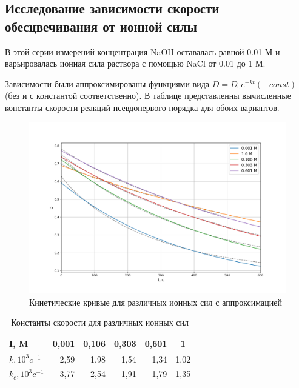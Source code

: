 \documentclass[a4paper, 12pt]{article}
\begin{document}
\newpage
\subsection{Исследование зависимости скорости обесцвечивания от ионной силы}


В этой серии измерений концентрация NaOH оставалась равной 0.01 М и варьировалась ионная сила раствора с помощью NaCl от 0.01 до 1 М. 

Зависимости были аппроксимированы функциями вида $D = D_0 e^{-kt}( +const)$ (без и с константой соответственно). В таблице представленны вычисленные константы скорости реакций псевдопервого порядка для обоих вариантов.
 \begin{figure}[h!]
    \begin{center}
    \includegraphics[width=1\textwidth]{fig3.2.png}
    \end{center}
    \caption{Кинетические кривые для различных ионных сил с аппроксимацией}
\end{figure}

\begin{table}[h!]
\begin{center}
\caption{Константы скорости для различных ионных сил}
\begin{tabular}{|l|r|r|r|r|r|}
\hline
I, M                         & \multicolumn{1}{c|}{0,001} & \multicolumn{1}{c|}{0,106} & \multicolumn{1}{c|}{0,303} & \multicolumn{1}{c|}{0,601} & \multicolumn{1}{c|}{1} \\ \hline
$k, 10^3 c^{-1}$   & 2,59                       & 1,98                       & 1,54                       & 1,34                       & 1,02                   \\ \hline
$k_c, 10^3 c^{-1}$ & 3,77                       & 2,54                       & 1,91                       & 1,79                       & 1,35                   \\ \hline
\end{tabular}
\end{center}
\end{table}
\end{document}
